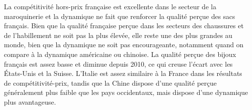 \documentclass[french,10pt,a4paper]{article}
\begin{document}
La compétitivité hors-prix française est excellente dans le secteur de la maroquinerie et la dynamique ne fait que renforcer la qualité perçue des sacs français. Bien que la qualité française perçue dans les secteurs des chaussures et de l'habillement ne soit pas la plus élevée, elle reste une des plus grandes au monde, bien que la dynamique ne soit pas encourageante, notamment quand on compare à la dynamique américaine ou chinoise. La qualité perçue des bijoux français est assez basse et diminue depuis 2010, ce qui creuse l'écart avec les États-Unis et la Suisse. L'Italie est assez similaire à la France dans les résultats de compétitivité-prix, tandis que la Chine dispose d'une qualité perçue généralement plus faible que les pays occidentaux, mais dispose d'une dynamique plus avantageuse. 





\end{document}

